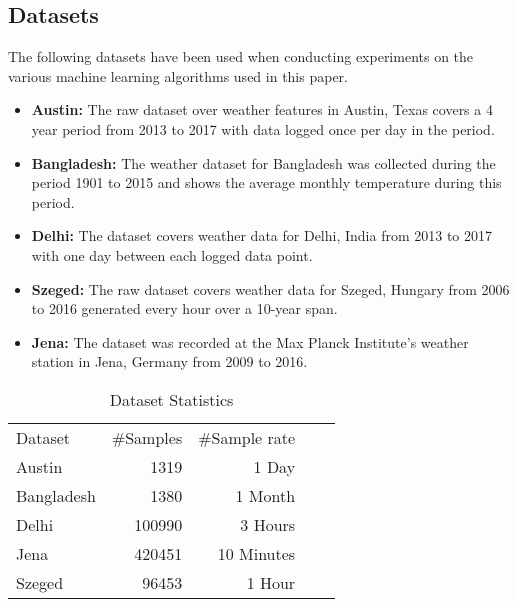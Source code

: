 \label{sec:ExpRes}
\subsection{Datasets}
The following datasets have been used when conducting experiments on the various machine learning algorithms used in this paper.
\begin{itemize}
    \item \textbf{Austin:} The raw dataset over weather features in Austin, Texas covers a 4 year period from 2013 to 2017 with data logged once per day in the period.
    \item \textbf{Bangladesh:} The weather dataset for Bangladesh was collected during the period 1901 to 2015 and shows the average monthly temperature during this period. 
    \item \textbf{Delhi:} The dataset covers weather data for Delhi, India from 2013 to 2017 with one day between each logged data point.
    \item \textbf{Szeged:} The raw dataset covers weather data for Szeged, Hungary from 2006 to 2016 generated every hour over a 10-year span.
    \item \textbf{Jena:} The dataset was recorded at the Max Planck Institute's weather station in Jena, Germany from 2009 to 2016.
\end{itemize}

\begin{table}[!ht]
\centering
\caption {Dataset Statistics} \label{tab:DatasetTable}
\begin{tabular}{|l|r|r|ll}
\cline{1-3}
Dataset    & \multicolumn{1}{l|}{\#Samples} & \multicolumn{1}{l|}{\#Sample rate} &  &  \\ \cline{1-3}
Austin     & 1319                           & 1 Day                              &  &  \\ \cline{1-3}
Bangladesh & 1380                           & 1 Month                            &  &  \\ \cline{1-3}
Delhi      & 100990                         & 3 Hours                            &  &  \\ \cline{1-3}
Jena       & 420451                         & 10 Minutes                         &  &  \\ \cline{1-3}
Szeged     & 96453                          & 1 Hour                             &  &  \\ \cline{1-3}
\end{tabular}
\end{table}

